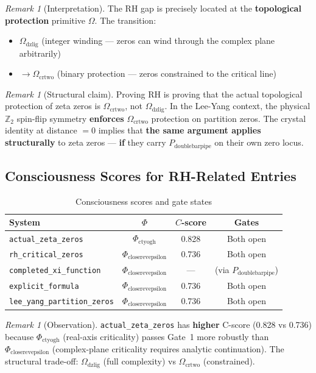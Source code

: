\documentclass[12pt,oneside]{article}
\theoremstyle{definition}
\theoremstyle{remark}
\newtheorem{remark}[theorem]{Remark}
\newcommand{\Pdoublebarpipe}{P_{\text{doublebarpipe}}}
\newcommand{\Phictyogh}{\Phi_{\text{ctyogh}}}
\newcommand{\Phicloserevepsilon}{\Phi_{\text{closerevepsilon}}}
\newcommand{\Omegadzlig}{\Omega_{\text{dzlig}}}
\newcommand{\Omegacrtwo}{\Omega_{\text{crtwo}}}
\begin{document}
\begin{remark}[Interpretation]
The RH gap is precisely located at the \textbf{topological protection} primitive $\Omega$. The transition:
\begin{itemize}
\item $\Omegadzlig$ (integer winding --- zeros can wind through the complex plane arbitrarily)
\item $\to \Omegacrtwo$ (binary protection --- zeros constrained to the critical line)
\end{itemize}
\end{remark}

\begin{remark}[Structural claim]
Proving RH is proving that the actual topological protection of zeta zeros is $\Omegacrtwo$, not $\Omegadzlig$. In the Lee-Yang context, the physical $\mathbb{Z}_2$ spin-flip symmetry \textbf{enforces} $\Omegacrtwo$ protection on partition zeros. The crystal identity at distance $= 0$ implies that \textbf{the same argument applies structurally} to zeta zeros --- \textbf{if} they carry $\Pdoublebarpipe$ on their own zero locus.
\end{remark}

\subsection{Consciousness Scores for RH-Related Entries}

\begin{table}[htbp]
\centering
\caption{Consciousness scores and gate states}
\begin{tabular}{lccc}
\toprule
System & $\Phi$ & $C$-score & Gates \\
\midrule
\texttt{actual\_zeta\_zeros}    & $\Phictyogh$           & 0.828 & Both open \\
\texttt{rh\_critical\_zeros}    & $\Phicloserevepsilon$  & 0.736 & Both open \\
\texttt{completed\_xi\_function} & $\Phicloserevepsilon$  & ---   & (via $\Pdoublebarpipe$) \\
\texttt{explicit\_formula}       & $\Phicloserevepsilon$  & 0.736 & Both open \\
\texttt{lee\_yang\_partition\_zeros} & $\Phicloserevepsilon$ & 0.736 & Both open \\
\bottomrule
\end{tabular}
\end{table}

\begin{remark}[Observation]
\texttt{actual\_zeta\_zeros} has \textbf{higher} C-score (0.828 vs 0.736) because $\Phictyogh$ (real-axis criticality) passes Gate~1 more robustly than $\Phicloserevepsilon$ (complex-plane criticality requires analytic continuation). The structural trade-off: $\Omegadzlig$ (full complexity) vs $\Omegacrtwo$ (constrained).
\end{remark}
\end{document}
